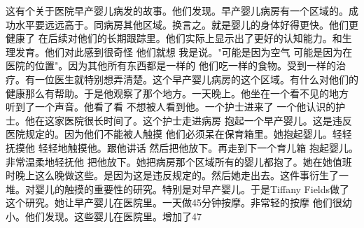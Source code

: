 这有个关于医院早产婴儿病发的故事。他们发现。早产婴儿病房有一个区域的。成功水平要远远高于。同病房其他区域。换言之。就是婴儿的身体好得更快。他们更健康了 在后续对他们的长期跟踪里。他们实际上显示出了更好的认知能力。和生理发育。他们对此感到很奇怪 他们就想 我是说。"可能是因为空气 可能是因为在医院的位置"。因为其他所有东西都是一样的 他们吃一样的食物。受到一样的治疗。有一位医生就特别想弄清楚。这个早产婴儿病房的这个区域。有什么对他们的健康那么有帮助。于是他观察了那个地方。一天晚上。他坐在一个看不见的地方 听到了一个声音。他看了看 不想被人看到他。一个护士进来了 一个他认识的护士。他在这家医院很长时间了。这个护士走进病房 抱起一个早产婴儿。这是违反医院规定的。因为他们不能被人触摸 他们必须呆在保育箱里。她抱起婴儿。轻轻抚摸他 轻轻地触摸他。跟他讲话 然后把他放下。再走到下一个育儿箱 抱起婴儿。非常温柔地轻抚他 把他放下。她把病房那个区域所有的婴儿都抱了。她在她值班时晚上这么晚做这些。是因为这是违反规定的。然后她走出去。这件事衍生了一堆。对婴儿的触摸的重要性的研究。特别是对早产婴儿。于是Tiffany Fields做了这个研究。她让早产婴儿在医院里。一天做45分钟按摩。非常轻的按摩 他们很幼小。他们发现。这些婴儿在医院里。增加了47%

